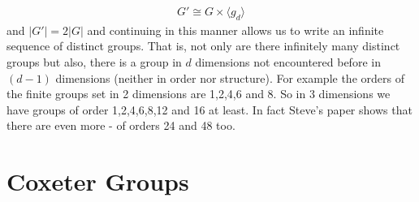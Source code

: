 \begin{align}
	G' \cong G \times \langle g_d \rangle
\end{align}
and $|G'| = 2|G|$ and continuing in this manner allows us to write an infinite sequence of distinct groups. That is, not only are there infinitely many distinct groups but also, there is a group in $d$ dimensions not encountered before in $(d-1)$ dimensions (neither in order nor structure). For example the orders of the finite groups set in 2 dimensions are 1,2,4,6 and 8. So in 3 dimensions we have groups of order 1,2,4,6,8,12 and 16 at least. In fact Steve's paper shows that there are even more - of orders 24 and 48 too.

\section{Coxeter Groups}

